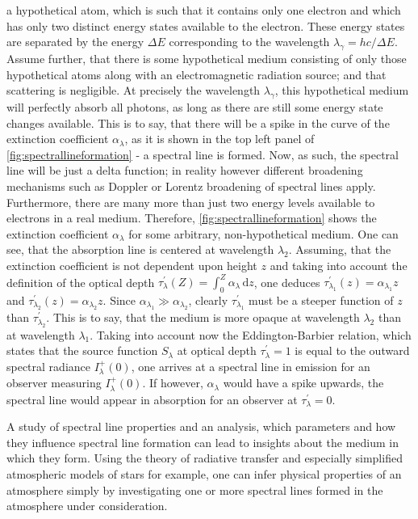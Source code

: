 \documentclass[a4paper,12pt]{report}
\def\lk#1{{\color{black}{#1}}}
\begin{document}
\lk{Suppose that there is} a hypothetical atom, which is such that it contains only one electron and which has only two distinct energy states available to the electron. These energy states are separated by the energy $\Delta E$ corresponding to the wavelength $\lambda_\gamma = hc/\Delta E$. Assume further, that there is some hypothetical medium consisting of only those hypothetical atoms along with an electromagnetic radiation source; and that scattering is negligible. At precisely the wavelength $\lambda_\gamma$, this hypothetical medium will perfectly absorb all photons, as long as there are still some energy state changes available. This is to say, that there will be a spike in the curve of the extinction coefficient $\alpha_\lambda$, as it is shown in the top left panel of \cref{fig:spectrallineformation} - a spectral line is formed. Now, as such, the spectral line will be just a delta function; in reality however different broadening mechanisms such as Doppler or Lorentz broadening of spectral lines apply. Furthermore, there are many more than just two energy levels available to electrons in a real medium. Therefore, \cref{fig:spectrallineformation}  shows the extinction coefficient $\alpha_\lambda$ for some arbitrary, non-hypothetical medium. One can see, that the absorption line is centered at wavelength $\lambda_2$. Assuming, that the extinction coefficient is not dependent upon height $z$ and taking into account the definition of the optical depth $\tau_\lambda^\prime(Z) = \int_{0}^{Z}\alpha_\lambda \,\mathrm{d}z$, one deduces $\tau_{\lambda_1}^\prime(z) = \alpha_{\lambda_1}z$ and $\tau_{\lambda_2}^\prime(z) = \alpha_{\lambda_2}z$. Since $\alpha_{\lambda_1} \gg \alpha_{\lambda_2}$, clearly $\tau_{\lambda_1}^\prime$ must be a steeper function of $z$ than $\tau_{\lambda_2}^\prime$. This is to say, that the medium is more opaque at wavelength $\lambda_2$ than at wavelength $\lambda_1$. Taking into account now the Eddington-Barbier relation, which states that the source function $S_\lambda$ at optical depth $\tau_\lambda^\prime= 1$ is equal to the outward spectral radiance $I_\lambda^+(0)$, one arrives at a spectral line in emission for an observer measuring $I_\lambda^+(0)$. If however, $\alpha_\lambda$ would have a spike upwards, the spectral line would appear in absorption for an observer at $\tau_\lambda^\prime = 0$.

A study of spectral line properties and an analysis, which parameters and how they influence spectral line formation can lead to insights about the medium in which they form. Using the theory of radiative transfer and especially simplified atmospheric models of stars for example, one can infer physical properties of an atmosphere simply by investigating one or more spectral lines formed in the atmosphere under consideration.
\end{document}
